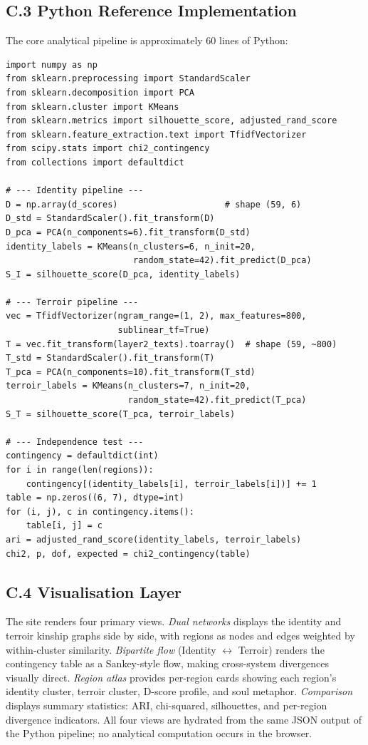 \documentclass[11pt]{article}
\begin{document}
\subsection*{C.3 Python Reference Implementation}
The core analytical pipeline is approximately 60 lines of Python:

\begin{verbatim}
import numpy as np
from sklearn.preprocessing import StandardScaler
from sklearn.decomposition import PCA
from sklearn.cluster import KMeans
from sklearn.metrics import silhouette_score, adjusted_rand_score
from sklearn.feature_extraction.text import TfidfVectorizer
from scipy.stats import chi2_contingency
from collections import defaultdict

# --- Identity pipeline ---
D = np.array(d_scores)                     # shape (59, 6)
D_std = StandardScaler().fit_transform(D)
D_pca = PCA(n_components=6).fit_transform(D_std)
identity_labels = KMeans(n_clusters=6, n_init=20,
                         random_state=42).fit_predict(D_pca)
S_I = silhouette_score(D_pca, identity_labels)

# --- Terroir pipeline ---
vec = TfidfVectorizer(ngram_range=(1, 2), max_features=800,
                      sublinear_tf=True)
T = vec.fit_transform(layer2_texts).toarray()  # shape (59, ~800)
T_std = StandardScaler().fit_transform(T)
T_pca = PCA(n_components=10).fit_transform(T_std)
terroir_labels = KMeans(n_clusters=7, n_init=20,
                        random_state=42).fit_predict(T_pca)
S_T = silhouette_score(T_pca, terroir_labels)

# --- Independence test ---
contingency = defaultdict(int)
for i in range(len(regions)):
    contingency[(identity_labels[i], terroir_labels[i])] += 1
table = np.zeros((6, 7), dtype=int)
for (i, j), c in contingency.items():
    table[i, j] = c
ari = adjusted_rand_score(identity_labels, terroir_labels)
chi2, p, dof, expected = chi2_contingency(table)
\end{verbatim}

\subsection*{C.4 Visualisation Layer}
The site renders four primary views. \emph{Dual networks} displays the identity and terroir kinship graphs side by side, with regions as nodes and edges weighted by within-cluster similarity. \emph{Bipartite flow} (Identity $\leftrightarrow$ Terroir) renders the contingency table as a Sankey-style flow, making cross-system divergences visually direct. \emph{Region atlas} provides per-region cards showing each region's identity cluster, terroir cluster, D-score profile, and soul metaphor. \emph{Comparison} displays summary statistics: ARI, chi-squared, silhouettes, and per-region divergence indicators. All four views are hydrated from the same JSON output of the Python pipeline; no analytical computation occurs in the browser.
\end{document}

